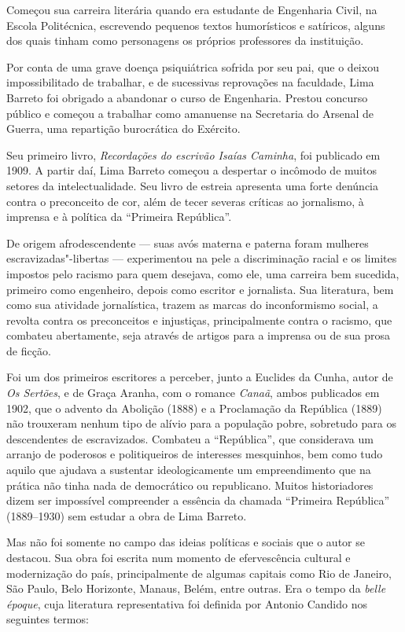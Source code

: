 \documentclass[11pt]{extarticle}
\begin{document}
{{Começou sua carreira literária quando era estudante de Engenharia Civil,
na Escola Politécnica, escrevendo pequenos textos humorísticos e
satíricos, alguns dos quais tinham como personagens os próprios
professores da instituição.


Por conta de uma grave doença psiquiátrica sofrida por seu pai, que o
deixou impossibilitado de trabalhar, e de sucessivas reprovações na
faculdade, Lima Barreto foi obrigado a abandonar o curso de Engenharia.
Prestou concurso público e começou a trabalhar como amanuense na
Secretaria do Arsenal de Guerra, uma repartição burocrática do Exército.

Seu primeiro livro, \emph{Recordações do escrivão Isaías Caminha}, foi
publicado em 1909. A partir daí, Lima Barreto começou a despertar o
incômodo de muitos setores da intelectualidade. Seu livro de estreia
apresenta uma forte denúncia contra o preconceito de cor, além de tecer
severas críticas ao jornalismo, à imprensa e à política da ``Primeira
República''.

De origem afrodescendente --- suas avós materna e paterna foram mulheres
escravizadas"-libertas --- experimentou na pele a discriminação racial e
os limites impostos pelo racismo para quem desejava, como ele, uma
carreira bem sucedida, primeiro como engenheiro, depois como escritor e
jornalista. Sua literatura, bem como sua atividade jornalística, trazem
as marcas do inconformismo social, a revolta contra os preconceitos e
injustiças, principalmente contra o racismo, que combateu abertamente,
seja através de artigos para a imprensa ou de sua prosa de ficção.

Foi um dos primeiros escritores a perceber, junto a Euclides da Cunha,
autor de \emph{Os Sertões}, e de Graça Aranha, com o romance
\emph{Canaã}, ambos publicados em 1902, que o advento da Abolição (1888)
e a Proclamação da República (1889) não trouxeram nenhum tipo de alívio
para a população pobre, sobretudo para os descendentes de escravizados.
Combateu a ``República'', que considerava um arranjo de poderosos e
politiqueiros de interesses mesquinhos, bem como tudo aquilo que ajudava
a sustentar ideologicamente um empreendimento que na prática não tinha
nada de democrático ou republicano. Muitos historiadores dizem ser
impossível compreender a essência da chamada ``Primeira República''
(1889--1930) sem estudar a obra de Lima Barreto.

Mas não foi somente no campo das ideias políticas e sociais que o autor
se destacou. Sua obra foi escrita num momento de efervescência cultural
e modernização do país, principalmente de algumas capitais como Rio de
Janeiro, São Paulo, Belo Horizonte, Manaus, Belém, entre outras. Era o
tempo da \emph{belle époque}, cuja literatura representativa foi
definida por Antonio Candido nos seguintes termos:

}}
\end{document}
